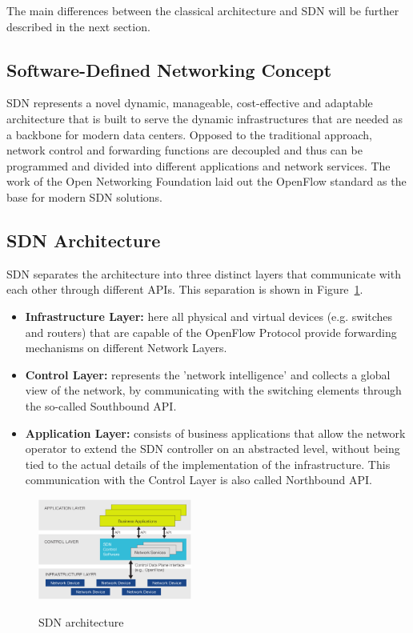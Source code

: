 The main differences between the classical architecture and SDN will be further described in the next section.

\subsection{Software-Defined Networking Concept}

SDN represents a novel dynamic, manageable, cost-effective and adaptable architecture \cite{onfdefinition} that is built to serve the dynamic infrastructures that are needed as a backbone for modern data centers. Opposed to the traditional approach, network control and forwarding functions are decoupled and thus can be programmed and divided into different applications and network services.
The work of the Open Networking Foundation laid out the OpenFlow standard as the base for modern SDN solutions.

\subsection{SDN Architecture}

SDN separates the architecture into three distinct layers that communicate with each other through different APIs. This separation is shown in Figure~\ref{fig:sdn-arch}.

\begin{itemize}
\item \textbf{Infrastructure Layer:} here all physical and virtual devices (e.g. switches and routers) that are capable of the OpenFlow Protocol provide forwarding mechanisms on different Network Layers.
\item \textbf{Control Layer:} represents the 'network intelligence' and collects a global view of the network, by communicating with the switching elements through the so-called Southbound API.
\item \textbf{Application Layer:} consists of business applications that allow the network operator to extend the SDN controller on an abstracted level, without being tied to the actual details of the implementation of the infrastructure. This communication with the Control Layer is also called Northbound API.
\end{itemize}

\begin{figure}[H]
\centering

\includegraphics[width=0.45\textwidth]{images/fundamentals/sdn_logical_architecture.png}

\caption{SDN architecture} \cite{onfdefinition}\label{fig:sdn-arch}
\end{figure}


